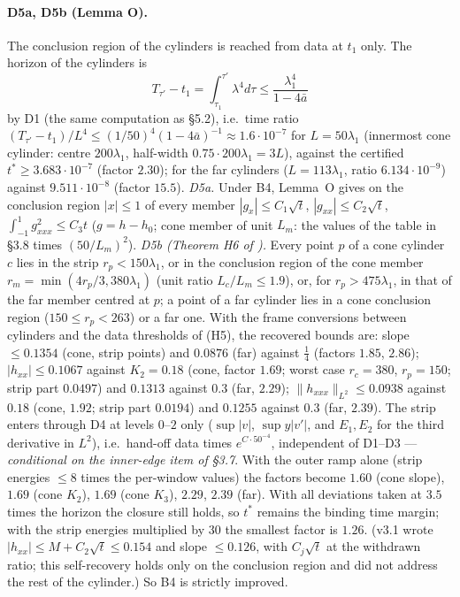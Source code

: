 \documentclass[11pt]{article}
\theoremstyle{definition}
\theoremstyle{remark}
\newcommand{\fn}[1]{\texttt{\detokenize{#1}}}
\newcommand{\norm}[1]{\lVert #1\rVert}
\begin{document}
\paragraph{D5a, D5b (Lemma O).} The conclusion region of the cylinders is reached from data at $t_1$ only. The horizon of the cylinders is
\[
T_{\tau'}-t_1=\int_{\tau_1}^{\tau'}\lambda^4d\tau\le\frac{\lambda_1^4}{1-4\bar a}
\]
by D1 (the same computation as \S5.2), i.e.\ time ratio $(T_{\tau'}-t_1)/L^4\le(1/50)^4(1-4\bar a)^{-1}\approx1.6\cdot10^{-7}$ for $L=50\lambda_1$ (innermost cone cylinder: centre $200\lambda_1$, half-width $0.75\cdot200\lambda_1=3L$), against the certified $t^*\ge3.683\cdot10^{-7}$ (factor $2.30$); for the far cylinders ($L=113\lambda_1$, ratio $6.134\cdot10^{-9}$) against $9.511\cdot10^{-8}$ (factor $15.5$). \emph{D5a.} Under B4, Lemma~O gives on the conclusion region $|x|\le1$ of every member $|g_x|\le C_1\sqrt t$, $|g_{xx}|\le C_2\sqrt t$, $\int_{-1}^1g_{xxx}^2\le C_3t$ ($g=h-h_0$; cone member of unit $L_m$: the values of the table in \S3.8 times $(50/L_m)^2$). \emph{D5b (Theorem H6 of \fn{lemmaO_v32.tex}).} Every point $p$ of a cone cylinder $c$ lies in the strip $r_p<150\lambda_1$, or in the conclusion region of the cone member $r_m=\min(4r_p/3,380\lambda_1)$ (unit ratio $L_c/L_m\le1.9$), or, for $r_p>475\lambda_1$, in that of the far member centred at $p$; a point of a far cylinder lies in a cone conclusion region ($150\le r_p<263$) or a far one. With the frame conversions between cylinders and the data thresholds of (H5), the recovered bounds are: slope $\le0.1354$ (cone, strip points) and $0.0876$ (far) against $\tfrac14$ (factors $1.85$, $2.86$); $|h_{xx}|\le0.1067$ against $K_2=0.18$ (cone, factor $1.69$; worst case $r_c=380$, $r_p=150$; strip part $0.0497$) and $0.1313$ against $0.3$ (far, $2.29$); $\norm{h_{xxx}}_{L^2}\le0.0938$ against $0.18$ (cone, $1.92$; strip part $0.0194$) and $0.1255$ against $0.3$ (far, $2.39$). The strip enters through D4 at levels $0$--$2$ only ($\sup|v|$, $\sup y|v'|$, and $E_1,E_2$ for the third derivative in $L^2$), i.e.\ hand-off data times $e^{C\cdot50^{-4}}$, independent of D1--D3 --- \emph{conditional on the inner-edge item of \S3.7}. With the outer ramp alone (strip energies $\le8$ times the per-window values) the factors become $1.60$ (cone slope), $1.69$ (cone $K_2$), $1.69$ (cone $K_3$), $2.29$, $2.39$ (far). With all deviations taken at $3.5$ times the horizon the closure still holds, so $t^*$ remains the binding time margin; with the strip energies multiplied by $30$ the smallest factor is $1.26$. (v3.1 wrote $|h_{xx}|\le M+C_2\sqrt t\le0.154$ and slope $\le0.126$, with $C_j\sqrt t$ at the withdrawn ratio; this self-recovery holds only on the conclusion region and did not address the rest of the cylinder.) So B4 is strictly improved.
\end{document}
